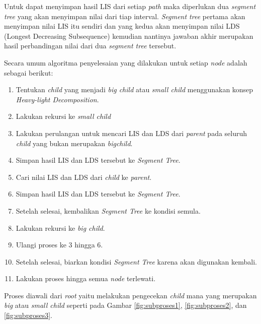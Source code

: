 \quad Untuk dapat menyimpan hasil LIS dari setiap \textit{path} maka diperlukan dua \textit{segment tree} yang akan menyimpan nilai dari tiap interval. \textit{Segment tree} pertama akan menyimpan nilai LIS itu sendiri dan yang kedua akan menyimpan nilai LDS (Longest Decreasing Subsequence) kemudian nantinya jawaban akhir merupakan hasil perbandingan nilai dari dua \textit{segment tree} tersebut.
 
\quad Secara umum algoritma penyelesaian yang dilakukan untuk setiap \textit{node} adalah sebagai berikut:
\begin{enumerate}
	\item Tentukan \textit{child} yang menjadi \textit{big child} atau \textit{small child} menggunakan konsep \textit{Heavy-light Decomposition}.
	\item Lakukan rekursi ke \textit{small child}
	\item Lakukan perulangan untuk mencari LIS dan LDS dari \textit{parent} pada seluruh \textit{child} yang bukan merupakan \textit{bigchild}.
	\item Simpan hasil LIS dan LDS tersebut ke \textit{Segment Tree}.
	\item Cari nilai LIS dan LDS dari \textit{child} ke \textit{parent}.
	\item Simpan hasil LIS dan LDS tersebut ke \textit{Segment Tree}.
	\item Setelah selesai, kembalikan \textit{Segment Tree} ke kondisi semula.
	\item Lakukan rekursi ke \textit{big child}.
	\item Ulangi proses ke 3 hingga 6.
	\item Setelah selesai, biarkan kondisi \textit{Segment Tree} karena akan digunakan kembali.
	\item Lakukan proses hingga semua \textit{node} terlewati.
\end{enumerate}
\quad Proses diawali dari \textit{root} yaitu melakukan pengecekan \textit{child} mana yang merupakan \textit{big} atau \textit{small child} seperti pada Gambar \ref{fig:subproses1}, \ref{fig:subproses2}, dan \ref{fig:subproses3}.
